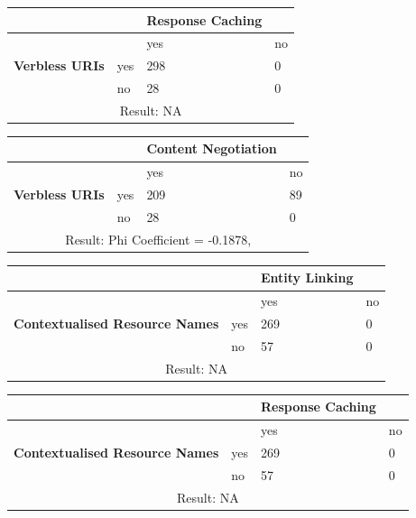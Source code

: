 \documentclass[a4paper,12pt]{article}
\begin{document}
\begin{center}
  \begin{tabular}{| p{60mm} | p{10mm} | p{35mm} | p{35mm} |}
  \hline
   & & \textbf{Response Caching} &
  \\
  \hline
  & & yes & no
  \\
  \hline
  \textbf{Verbless URIs} & yes & 298 & 0
  \\
  \hline
   & no & 28 & 0
  \\
  \hline
  \multicolumn{4}{|c|}{Result: NA}
  \\ \hline
  \end{tabular}
  \end{center}

\begin{center}
  \begin{tabular}{| p{60mm} | p{10mm} | p{35mm} | p{35mm} |}
  \hline
   & & \textbf{Content Negotiation} &
  \\
  \hline
  & & yes & no
  \\
  \hline
  \textbf{Verbless URIs} & yes & 209 & 89
  \\
  \hline
   & no & 28 & 0
  \\
  \hline
  \multicolumn{4}{|c|}{Result: Phi Coefficient = -0.1878, }
  \\ \hline
  \end{tabular}
  \end{center}

\begin{center}
  \begin{tabular}{| p{60mm} | p{10mm} | p{35mm} | p{35mm} |}
  \hline
   & & \textbf{Entity Linking} &
  \\
  \hline
  & & yes & no
  \\
  \hline
  \textbf{Contextualised Resource Names} & yes & 269 & 0
  \\
  \hline
   & no & 57 & 0
  \\
  \hline
  \multicolumn{4}{|c|}{Result: NA}
  \\ \hline
  \end{tabular}
  \end{center}

\begin{center}
  \begin{tabular}{| p{60mm} | p{10mm} | p{35mm} | p{35mm} |}
  \hline
   & & \textbf{Response Caching} &
  \\
  \hline
  & & yes & no
  \\
  \hline
  \textbf{Contextualised Resource Names} & yes & 269 & 0
  \\
  \hline
   & no & 57 & 0
  \\
  \hline
  \multicolumn{4}{|c|}{Result: NA}
  \\ \hline
  \end{tabular}
  \end{center}
\end{document}
